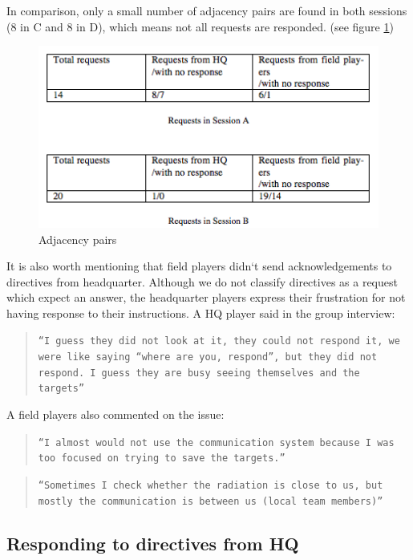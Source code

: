 In comparison, only a small number of adjacency pairs are found in both sessions (8 in C and 8 in D), which means not all requests are responded. (see figure \ref{fig:adjacencypairs})

\begin{figure}[h]
  \centering
  \includegraphics[width=1\textwidth]{img/study1/adjpairs}
  \caption{ Adjacency pairs}
  \label{fig:adjacencypairs}
\end{figure}

It is also worth mentioning that field players didn`t send acknowledgements to directives from headquarter. Although we do not classify directives as a request which expect an answer, the headquarter players express their frustration for not having response to their instructions. A HQ player said in the group interview:\\
\begin{quote}
\texttt{``I guess they did not look at it, they could not respond it, we were like saying ``where are you, respond'', but they did not respond. I guess they are busy seeing themselves and the targets''}
\end{quote}

A field players also commented on the issue:\\

\begin{quote}
\texttt{``I almost would not use the communication system because I was too focused on trying to save the targets.''}
\end{quote}

\begin{quote}
\texttt{``Sometimes I check whether the radiation is close to us, but mostly the communication is between us (local team members)''}
\end{quote}


\subsection{Responding to directives from HQ}

